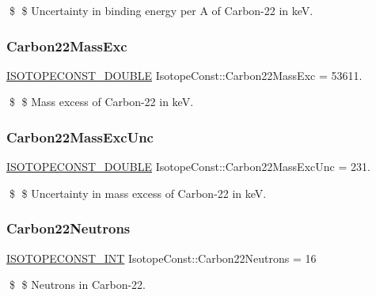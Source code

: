 \$ \$ Uncertainty in binding energy per A of Carbon-\/22 in keV. \mbox{\label{group___isotope_const-_carbon-_c22_ga335608390aeda3954305eed551419990}} 
\subsubsection{\texorpdfstring{Carbon22\+Mass\+Exc}{Carbon22MassExc}}
{\footnotesize\ttfamily \mbox{\hyperlink{group___isotope_const-_macros_ga8f45a7272ce02c0b4c65c44636ed719a}{I\+S\+O\+T\+O\+P\+E\+C\+O\+N\+S\+T\+\_\+\+D\+O\+U\+B\+LE}} Isotope\+Const\+::\+Carbon22\+Mass\+Exc = 53611.}

\$ \$ Mass excess of Carbon-\/22 in keV. \mbox{\label{group___isotope_const-_carbon-_c22_ga7f17e494e8488873a9e6f7d9a0dc69be}} 
\subsubsection{\texorpdfstring{Carbon22\+Mass\+Exc\+Unc}{Carbon22MassExcUnc}}
{\footnotesize\ttfamily \mbox{\hyperlink{group___isotope_const-_macros_ga8f45a7272ce02c0b4c65c44636ed719a}{I\+S\+O\+T\+O\+P\+E\+C\+O\+N\+S\+T\+\_\+\+D\+O\+U\+B\+LE}} Isotope\+Const\+::\+Carbon22\+Mass\+Exc\+Unc = 231.}

\$ \$ Uncertainty in mass excess of Carbon-\/22 in keV. \mbox{\label{group___isotope_const-_carbon-_c22_ga9bb685803c1ebab3ee77b097c5cd4036}} 
\subsubsection{\texorpdfstring{Carbon22\+Neutrons}{Carbon22Neutrons}}
{\footnotesize\ttfamily \mbox{\hyperlink{group___isotope_const-_macros_ga5f18360b3e99483a35c32d789e62621c}{I\+S\+O\+T\+O\+P\+E\+C\+O\+N\+S\+T\+\_\+\+I\+NT}} Isotope\+Const\+::\+Carbon22\+Neutrons = 16}

\$ \$ Neutrons in Carbon-\/22. \mbox{\label{group___isotope_const-_carbon-_c22_gada552d06ed8fbff336356e1b24750aa7}} 

